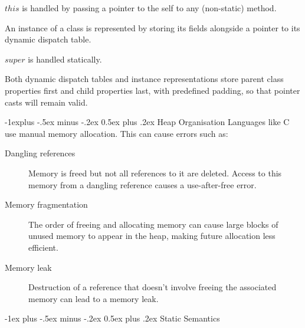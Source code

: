 \documentclass[10pt, landscape, a4]{article}
\makeatletter
\renewcommand{\section}{\@startsection{section}{1}{0mm}%
{-1ex plus -.5ex minus -.2ex}%
{0.5ex plus .2ex}%
{\normalfont\large\bfseries}}
\renewcommand{\subsection}{\@startsection{subsection}{2}{0mm}%
{-1explus -.5ex minus -.2ex}%
{0.5ex plus .2ex}%
{\normalfont\normalsize\bfseries}}
\makeatother
\begin{document}
\begin{multicols}{3}
$this$ is handled by passing a pointer to the self to any (non-static) method.

An instance of a class is represented by storing its fields alongside a pointer to its dynamic dispatch table.

$super$ is handled statically.

Both dynamic dispatch tables and instance representations store parent class properties first and child properties last, with predefined padding, so that pointer casts will remain valid.

\subsection{Heap Organisation}
Languages like C use manual memory allocation. This can cause errors such as:
\begin{description}
\item[Dangling references] Memory is freed but not all references to it are deleted. Access to this memory from a dangling reference causes a use-after-free error.
\item[Memory fragmentation] The order of freeing and allocating memory can cause large blocks of unused memory to appear in the heap, making future allocation less efficient.
\item[Memory leak] Destruction of a reference that doesn't involve freeing the associated memory can lead to a memory leak.
\end{description}

\section{Static Semantics}

\end{multicols}
\end{document}
